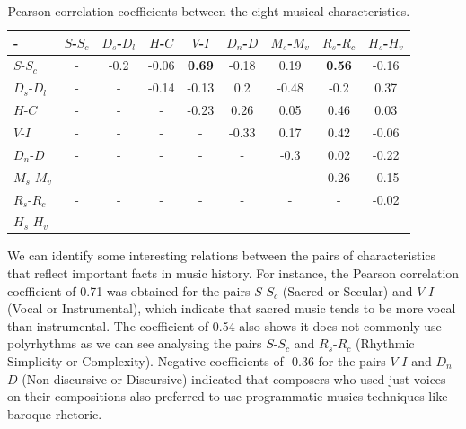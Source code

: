 \documentclass[
 aip,
 jmp,
 amsmath,amssymb,
 reprint,
]{revtex4-1}
\begin{document}
\begin{table}[ht]
\caption{\label{tab:tableB}Pearson correlation coefficients between
  the eight musical characteristics.}

\begin{ruledtabular}
\begin{tabular}{|l||c|c|c|c|c|c|c|c|}

-    & \tiny  $S$-$S_c$ & \tiny  $D_s$-$D_l$ & \tiny  $H$-$C$ & \tiny  $V$-$I$ & \tiny  $D_n$-$D$ & \tiny  $M_s$-$M_v$ & \tiny  $R_s$-$R_c$ & \tiny  $H_s$-$H_v$  \\ \hline
$S$-$S_c$ & -     &  -0.2 &  -0.06 &  \textbf{0.69}  & -0.18 &  0.19   &  \textbf{0.56} &  -0.16 \\
$D_s$-$D_l$ & -     &  -     &  -0.14 &  -0.13          &  0.2  &  -0.48  &  -0.2         &  0.37 \\
$H$-$C$ & -     &  -     &  -     &  -0.23          &  0.26  &  0.05  &  0.46          &  0.03 \\
$V$-$I$ & -     &  -     &  -     &  -              & -0.33 &  0.17   &  0.42          &  -0.06 \\
$D_n$-$D$ & -     &  -     &  -     &  -              &  -    &  -0.3  &  0.02          &  -0.22 \\
$M_s$-$M_v$ & -     &  -     &  -     &  -              &  -    &  -      &  0.26          &  -0.15 \\
$R_s$-$R_c$ & -     &  -     &  -     &  -              &  -    &  -      &  -             &  -0.02 \\
$H_s$-$H_v$ & -     &  -     &  -     &  -              &  -    &  -      &  -             &  - \\

\end{tabular}
\end{ruledtabular}
\end{table}

We can identify some interesting relations between the pairs of
characteristics that reflect important facts in music history. For
instance, the Pearson correlation coefficient of 0.71 was obtained for
the pairs $S$-$S_c$ (Sacred or Secular) and $V$-$I$ (Vocal or Instrumental),
which indicate that sacred music tends to be more vocal than
instrumental. The coefficient of 0.54 also shows it does not commonly use polyrhythms as we can see
analysing the pairs $S$-$S_c$ and $R_s$-$R_c$ (Rhythmic Simplicity or Complexity).
Negative coefficients of -0.36 for the pairs $V$-$I$ and $D_n$-$D$
(Non-discursive or Discursive) indicated that composers who used
just voices on their compositions also preferred to use programmatic
musics techniques like baroque rhetoric.
\end{document}
